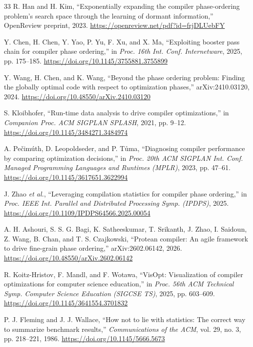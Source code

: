 \documentclass[conference,a4paper]{IEEEtran}
\begin{document}
\begin{thebibliography}{33}
R. Han and H. Kim,
``Exponentially expanding the compiler phase-ordering problem's search space through the learning of dormant information,'' OpenReview preprint, 2023.
\url{https://openreview.net/pdf?id=frjDLUebFY}

Y. Chen, H. Chen, Y. Yao, P. Yu, F. Xu, and X. Ma,
``Exploiting booster pass chain for compiler phase ordering,''
in \textit{Proc. 16th Int. Conf. Internetware}, 2025, pp. 175--185.
\url{https://doi.org/10.1145/3755881.3755899}

Y. Wang, H. Chen, and K. Wang,
``Beyond the phase ordering problem: Finding the globally optimal code with respect to optimization phases,'' arXiv:2410.03120, 2024.
\url{https://doi.org/10.48550/arXiv.2410.03120}

S. Kloibhofer,
``Run-time data analysis to drive compiler optimizations,''
in \textit{Companion Proc. ACM SIGPLAN SPLASH}, 2021, pp. 9--12.
\url{https://doi.org/10.1145/3484271.3484974}

A. Pe\v{c}im\'{u}th, D. Leopoldseder, and P. T\r{u}ma,
``Diagnosing compiler performance by comparing optimization decisions,''
in \textit{Proc. 20th ACM SIGPLAN Int. Conf. Managed Programming Languages and Runtimes (MPLR)}, 2023, pp. 47--61.
\url{https://doi.org/10.1145/3617651.3622994}

J. Zhao \textit{et al.},
``Leveraging compilation statistics for compiler phase ordering,''
in \textit{Proc. IEEE Int. Parallel and Distributed Processing Symp. (IPDPS)}, 2025.
\url{https://doi.org/10.1109/IPDPS64566.2025.00054}

A. H. Ashouri, S. S. G. Bagi, K. Satheeskumar, T. Srikanth, J. Zhao, I. Saidoun, Z. Wang, B. Chan, and T. S. Czajkowski,
``Protean compiler: An agile framework to drive fine-grain phase ordering,'' arXiv:2602.06142, 2026.
\url{https://doi.org/10.48550/arXiv.2602.06142}

R. Koitz-Hristov, F. Mandl, and F. Wotawa,
``VisOpt: Visualization of compiler optimizations for computer science education,''
in \textit{Proc. 56th ACM Technical Symp. Computer Science Education (SIGCSE TS)}, 2025, pp. 603--609.
\url{https://doi.org/10.1145/3641554.3701832}

P. J. Fleming and J. J. Wallace,
``How not to lie with statistics: The correct way to summarize benchmark results,''
\textit{Communications of the ACM}, vol. 29, no. 3, pp. 218--221, 1986.
\url{https://doi.org/10.1145/5666.5673}


\end{thebibliography}
\end{document}
